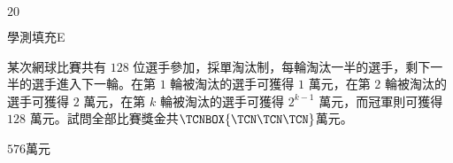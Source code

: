 \begin{QUESTIONS}
\begin{QUESTION}
\begin{QBODY}
        \end{QBODY}
        \begin{QFROMS}
        \end{QFROMS}
        \begin{QTAGS}\end{QTAGS}
        \begin{QANS}
            $20$
        \end{QANS}
        \begin{QSOLLIST}
        \end{QSOLLIST}
        \begin{QEMPTYSPACE}
        \end{QEMPTYSPACE}
    \end{QUESTION}
    \begin{QUESTION}
        \begin{ExamInfo}{91}{學測}{填充}{E}
        \end{ExamInfo}
        \begin{ExamAnsRateInfo}{41}{70}{41}{12}
        \end{ExamAnsRateInfo}
        \begin{QBODY}
            某次網球比賽共有 $128$ 位選手參加，採單淘汰制，每輪淘汰一半的選手，剩下一半的選手進入下一輪。在第 $1$ 輪被淘汰的選手可獲得 $1$ 萬元，在第 $2$ 輪被淘汰的選手可獲得 $2$ 萬元，在第 $k$ 輪被淘汰的選手可獲得 $2^{k-1}$ 萬元，而冠軍則可獲得 $128$ 萬元。試問全部比賽獎金共$\TCNBOX{\TCN\TCN\TCN}$萬元。
        \end{QBODY}
        \begin{QFROMS}
        \end{QFROMS}
        \begin{QTAGS}\end{QTAGS}
        \begin{QANS}
            $576$萬元
        \end{QANS}

\end{QUESTION}
\end{QUESTIONS}

